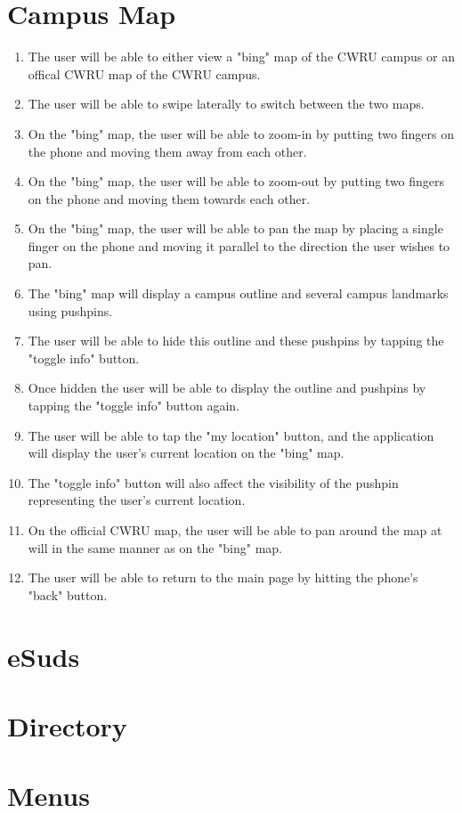 \documentclass[pdftex,12pt,letter]{article}
\begin{document}
\section{Campus Map}
\begin{enumerate}[1.]
\item The user will be able to either view a "bing" map of the CWRU campus or an offical CWRU map of the CWRU campus.
\item The user will be able to swipe laterally to switch between the two maps.
\item On the "bing" map, the user will be able to zoom-in by putting two fingers on the phone and moving them away from each other.
\item On the "bing" map, the user will be able to zoom-out by putting two fingers on the phone and moving them towards each other.
\item On the "bing" map, the user will be able to pan the map by placing a single finger on the phone and moving it parallel to the direction the user wishes to pan.
\item The "bing" map will display a campus outline and several campus landmarks using pushpins.
\item The user will be able to hide this outline and these pushpins by tapping the "toggle info" button.
\item Once hidden the user will be able to display the outline and pushpins by tapping the "toggle info" button again.
\item The user will be able to tap the "my location" button, and the application will display the user's current location on the "bing" map.
\item The "toggle info" button will also affect the visibility of the pushpin representing the user's current location.
\item On the official CWRU map, the user will be able to pan around the map at will in the same manner as on the "bing" map.
\item The user will be able to return to the main page by hitting the phone's "back" button.
\end{enumerate}
\section{eSuds}
\section{Directory}
\section{Menus}
\end{document}
